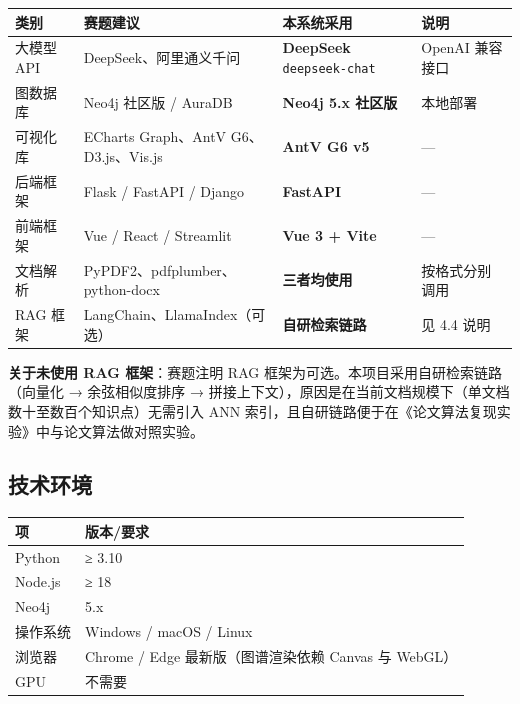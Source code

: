\documentclass[UTF8,a4paper,11pt]{ctexrep}
\begin{document}
\begin{center}
\small
\begin{tabularx}{\linewidth}{@{}XXXX@{}}
\toprule
类别 & 赛题建议 & 本系统采用 & 说明 \\
\midrule
大模型 API & DeepSeek、阿里通义千问 & \textbf{DeepSeek} \texttt{deepseek-chat} & OpenAI 兼容接口 \\
图数据库 & Neo4j 社区版 / AuraDB & \textbf{Neo4j 5.x 社区版} & 本地部署 \\
可视化库 & ECharts Graph、AntV G6、D3.js、Vis.js & \textbf{AntV G6 v5} & — \\
后端框架 & Flask / FastAPI / Django & \textbf{FastAPI} & — \\
前端框架 & Vue / React / Streamlit & \textbf{Vue 3 + Vite} & — \\
文档解析 & PyPDF2、pdfplumber、python-docx & \textbf{三者均使用} & 按格式分别调用 \\
RAG 框架 & LangChain、LlamaIndex（可选） & \textbf{自研检索链路} & 见 4.4 说明 \\
\bottomrule
\end{tabularx}
\end{center}
\begin{notebox}
\textbf{关于未使用 RAG 框架}：赛题注明 RAG 框架为可选。本项目采用自研检索链路（向量化 → 余弦相似度排序 → 拼接上下文），原因是在当前文档规模下（单文档数十至数百个知识点）无需引入 ANN 索引，且自研链路便于在《论文算法复现实验》中与论文算法做对照实验。

\end{notebox}


\subsection{技术环境}

\begin{center}
\small
\begin{tabularx}{\linewidth}{@{}XX@{}}
\toprule
项 & 版本/要求 \\
\midrule
Python & ≥ 3.10 \\
Node.js & ≥ 18 \\
Neo4j & 5.x \\
操作系统 & Windows / macOS / Linux \\
浏览器 & Chrome / Edge 最新版（图谱渲染依赖 Canvas 与 WebGL） \\
GPU & 不需要 \\
\bottomrule
\end{tabularx}
\end{center}
\end{document}
